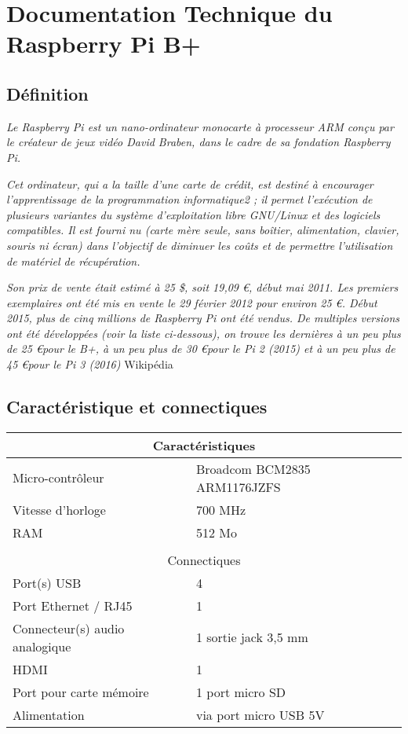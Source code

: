 
\chapter{Documentation Technique du Raspberry Pi B+}
\label{annexe:rpi}

\section{Définition}


\textit{\og Le Raspberry Pi est un nano-ordinateur monocarte à processeur ARM conçu par le créateur de jeux vidéo David Braben, dans le cadre de sa fondation Raspberry Pi.}

\textit{Cet ordinateur, qui a la taille d'une carte de crédit, est destiné à encourager l'apprentissage de la programmation informatique2 ; il permet l'exécution de plusieurs variantes du système d'exploitation libre GNU/Linux et des logiciels compatibles. Il est fourni nu (carte mère seule, sans boîtier, alimentation, clavier, souris ni écran) dans l'objectif de diminuer les coûts et de permettre l'utilisation de matériel de récupération.}

\textit{Son prix de vente était estimé à 25 \$, soit 19,09 \euro, début mai 2011. Les premiers exemplaires ont été mis en vente le 29 février 2012 pour environ 25 \euro. Début 2015, plus de cinq millions de Raspberry Pi ont été vendus. De multiples versions ont été développées (voir la liste ci-dessous), on trouve les dernières à un peu plus de 25 \euro pour le B+, à un peu plus de 30 \euro pour le Pi 2 (2015) et à un peu plus de 45 \euro pour le Pi 3 (2016)\fg{}} Wikipédia \cite{wiki_rpi}

\section{Caractéristique et connectiques}
\begin{tabular}[c]{|l|l|}
\hline
\multicolumn{2}{|c|}{Caractéristiques}\\
\hline
Micro-contrôleur &	Broadcom BCM2835 ARM1176JZFS\\
Vitesse d'horloge& 	700 MHz\\
RAM &	512 Mo\\
\hline
\multicolumn{2}{c}{}\\
\hline
\multicolumn{2}{|c|}{Connectiques}\\
\hline
Port(s) USB &	4\\
Port Ethernet / RJ45 &	1\\
Connecteur(s) audio analogique &	1 sortie jack 3,5 mm\\
HDMI 	&1\\
Port pour carte mémoire 	&1 port micro SD\\
Alimentation &	via port micro USB 5V\\
\hline
\end{tabular}

